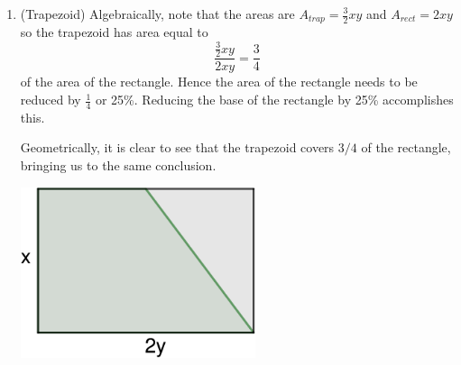 {\begin{enumerate}
		\item (Trapezoid) Algebraically, note that the areas are $A_{trap}=\frac32xy$ and $A_{rect}=2xy$ so the trapezoid has area equal to
		$$\frac{\frac32xy}{2xy}=\frac34$$
		of the area of the rectangle. Hence the area of the rectangle needs to be reduced by $\frac14$ or 25\%. Reducing the base of the rectangle by 25\% accomplishes this.\par
		Geometrically, it is clear to see that the trapezoid covers $3/4$ of the rectangle, bringing us to the same conclusion.
		\begin{center}
			\includegraphics[height=5cm]{images/FinalProject-fig01-solution.pdf}\par
		\end{center}
		

\end{enumerate}}
